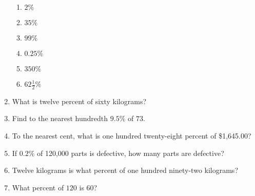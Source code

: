 \documentclass[12pt]{article}
\begin{document}
\begin{enumerate}
\begin{multicols}{2}
\begin{enumerate}
\item \hspace{0.5in} $2\%$
  \vspace{0.25in}

\item \hspace{0.5in} $35\%$
  \vspace{0.25in}

\item \hspace{0.5in} $99\%$
  \vspace{0.25in}

\item \hspace{0.5in} $0.25\%$
  \vspace{0.25in}

\item \hspace{0.5in} $350\%$
  \vspace{0.25in}

\item \hspace{0.5in} $62\frac{1}{2}\%$
  \vspace{0.25in}

\end{enumerate}
\end{multicols}

\item What is twelve percent of sixty kilograms? 
  \vspace{0.50in}

\item Find to the nearest hundredth $9.5\%$ of $73$. 
  \vspace{0.50in}

\item To the nearest cent, what is one hundred twenty-eight percent of \$1,645.00?
  \vspace{0.50in}

\item If $0.2\%$ of 120,000 parts is defective, how many parts are defective? 
  \vspace{0.50in}

\item Twelve kilograms is what percent of one hundred ninety-two kilograms? 
  \vspace{0.50in}

\item What percent of $120$ is $60$?
  \vspace{0.50in}


\end{enumerate}
\end{document}
